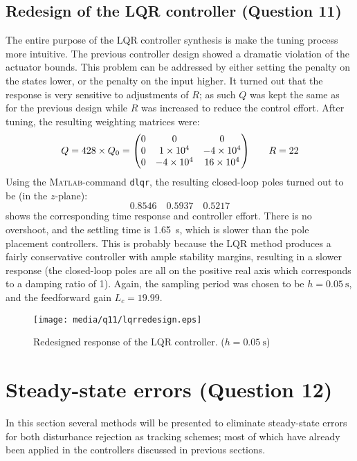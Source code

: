 \subsection{Redesign of the LQR controller \textnormal{\phantom{xxx}(Question 11)}}
\label{sec:retunelqr}
The entire purpose of the LQR controller synthesis is make the tuning process more intuitive. The previous controller design showed a dramatic violation of the actuator bounds. This problem can be addressed by either setting the penalty on the states lower, or the penalty on the input higher. It turned out that the response is very sensitive to adjustments of $R$; as such $Q$ was kept the same as for the previous design while $R$ was increased to reduce the control effort. After tuning, the resulting weighting matrices were:
$$ Q = 428\times Q_0 = \mqty( 0 & 0  & 0 \\
                              0 & \num{1e4} & -\num{4e4} \\
                              0 & -\num{4e4} & \num{16e4} \\) \qquad R = 22 $$
Using the \textsc{Matlab}-command \texttt{dlqr}, the resulting closed-loop poles turned out to be (in the $z$-plane):
    $$0.8546 \quad 0.5937 \quad 0.5217 $$
 shows the corresponding time response and controller effort. There is no overshoot, and the settling time is \SI{1.65}{\second}, which is slower than the pole placement controllers. This is probably because the LQR method produces a fairly conservative controller with ample stability margins, resulting in a slower response (the closed-loop poles are all on the positive real axis which corresponds to a damping ratio of 1). Again, the sampling period was chosen to be $h = \SI{0.05}{\second}$, and the feedforward gain $L_c = 19.99$.
\begin{figure}[ht]
    \centering
    \texttt{[image: media/q11/lqrredesign.eps]}
    \caption{Redesigned response of the LQR controller. ($h = \SI{0.05}{\second}$)}
    \label{fig:q11_lqrredesign}
\end{figure}

\clearpage
\section{Steady-state errors \textnormal{\phantom{xxx}(Question 12)}}
\label{sec:q12}
In this section several methods will be presented to eliminate steady-state errors for both disturbance rejection as tracking schemes; most of which have already been applied in the controllers discussed in previous sections. \cite{nise}
